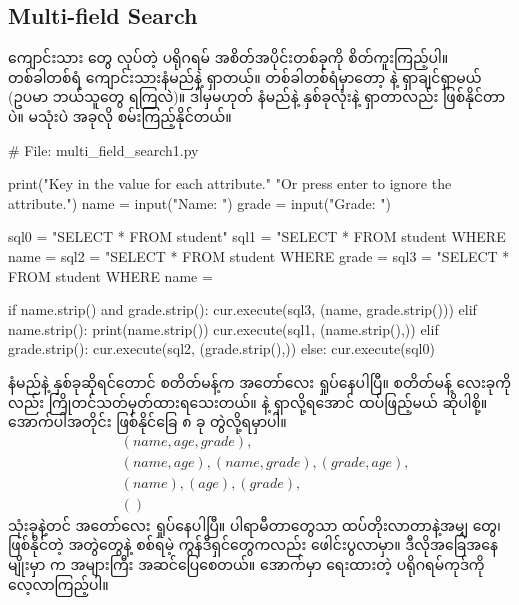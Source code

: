 \subsection*{Multi-field Search}
ကျောင်းသား  တွေ  လုပ်တဲ့ ပရိုဂရမ် အစိတ်အပိုင်းတစ်ခုကို စိတ်ကူးကြည့်ပါ။ တစ်ခါ\allowbreak တစ်ရံ ကျောင်းသားနံမည်နဲ့ ရှာတယ်။ တစ်ခါတစ်ရံမှာတော့  နဲ့ ရှာချင်ရှာမယ် (ဥပမာ ဘယ်သူတွေ  ရကြလဲ)။ ဒါမှမဟုတ် နံမည်နဲ့  နှစ်ခုလုံးနဲ့ ရှာတာလည်း ဖြစ်နိုင်တာပဲ။  မသုံးပဲ အခုလို စမ်းကြည့်နိုင်တယ်။
%
\begin{py}
# File: multi_field_search1.py

print("Key in the value for each attribute."
      "Or press enter to ignore the attribute.")
name = input("Name: ")
grade = input("Grade: ")

sql0 = "SELECT * FROM student"
sql1 = "SELECT * FROM student WHERE name = %
sql2 = "SELECT * FROM student WHERE grade = %
sql3 = "SELECT * FROM student WHERE name = %

if name.strip() and grade.strip():
    cur.execute(sql3, (name, grade.strip()))
elif name.strip():
    print(name.strip())
    cur.execute(sql1, (name.strip(),))
elif grade.strip():
    cur.execute(sql2, (grade.strip(),))
else:
    cur.execute(sql0)
\end{py}
%
နံမည်နဲ့  နှစ်ခုဆိုရင်တောင်  စတိတ်မန့်က အတော်လေး ရှုပ်နေပါပြီ။  စတိတ်မန့် လေးခုကိုလည်း ကြိုတင်သတ်မှတ်ထားရသေးတယ်။  နဲ့ ရှာလို့ရအောင် ထပ်ဖြည့်မယ် ဆိုပါစို့။ အောက်ပါအတိုင်း ဖြစ်နိုင်ခြေ ၈ ခု တွဲလို့ရမှာပါ။
\begin{align*}
&(name, age, grade),\\
&(name, age), (name, grade), (grade, age),\\
&(name), (age), (grade),\\
&()    
\end{align*}
သုံးခုနဲ့တင် အတော်လေး ရှုပ်နေပါပြီ။ ပါရာမီတာတွေသာ ထပ်တိုးလာတာနဲ့အမျှ  တွေ၊ ဖြစ်နိုင်တဲ့ အတွဲတွေနဲ့ စစ်ရမဲ့ ကွန်ဒီရှင်တွေကလည်း ဖေါင်းပွလာမှာ။ ဒီလိုအခြေအနေမျိုးမှာ  က အများကြီး အဆင်ပြေစေတယ်။ အောက်မှာ ရေးထားတဲ့ ပရိုဂရမ်ကုဒ်ကို လေ့လာကြည့်ပါ။
%
